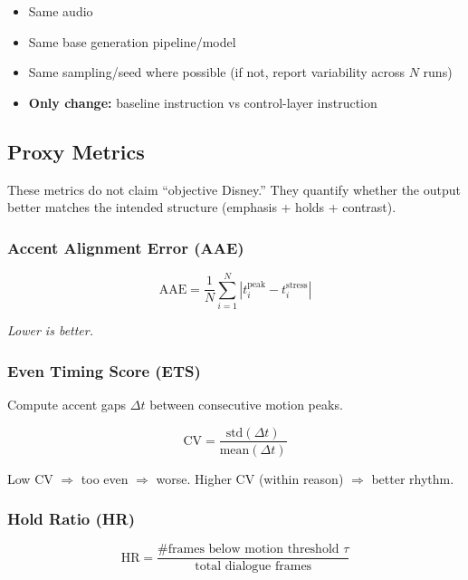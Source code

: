 \documentclass[11pt,a4paper]{article}
\begin{document}
\begin{itemize}[leftmargin=2em]
    \item Same audio
    \item Same base generation pipeline/model
    \item Same sampling/seed where possible (if not, report variability across $N$ runs)
    \item \textbf{Only change:} baseline instruction vs control-layer instruction
\end{itemize}

\subsection{Proxy Metrics}

These metrics do not claim ``objective Disney.'' They quantify whether the output better matches the intended structure (emphasis + holds + contrast).

\subsubsection{Accent Alignment Error (AAE)}

\begin{equation}
\text{AAE} = \frac{1}{N}\sum_{i=1}^{N} |t^{\text{peak}}_i - t^{\text{stress}}_i|
\label{eq:aae}
\end{equation}

\noindent\textit{Lower is better.}

\subsubsection{Even Timing Score (ETS)}

Compute accent gaps $\Delta t$ between consecutive motion peaks.

\begin{equation}
\text{CV} = \frac{\text{std}(\Delta t)}{\text{mean}(\Delta t)}
\label{eq:ets}
\end{equation}

\noindent Low CV $\Rightarrow$ too even $\Rightarrow$ worse. Higher CV (within reason) $\Rightarrow$ better rhythm.

\subsubsection{Hold Ratio (HR)}

\begin{equation}
\text{HR} = \frac{\text{\# frames below motion threshold } \tau}{\text{total dialogue frames}}
\label{eq:hr}
\end{equation}
\end{document}
